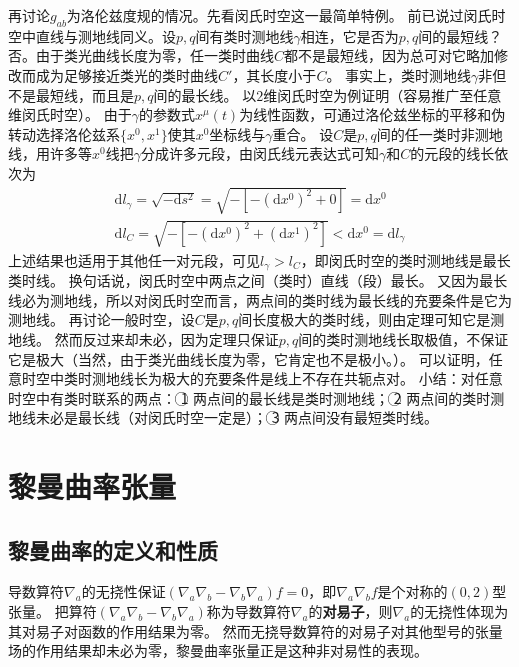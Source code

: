 再讨论$g_{ab}$为洛伦兹度规的情况。先看闵氏时空这一最简单特例。
前已说过闵氏时空中直线与测地线同义。设$p, q$间有类时测地线$\gamma$相连，它是否为$p, q$间的最短线？
否。由于类光曲线长度为零，任一类时曲线$C$都不是最短线，因为总可对它略加修改而成为足够接近类光的类时曲线$C'$，其长度小于$C$。
事实上，类时测地线$\gamma$非但不是最短线，而且是$p, q$间的最长线。
以$2$维闵氏时空为例证明（容易推广至任意维闵氏时空）。
由于$\gamma$的参数式$x^\mu(t)$为线性函数，可通过洛伦兹坐标的平移和伪转动选择洛伦兹系$\{x^0, x^1\}$使其$x^0$坐标线与$\gamma$重合。
设$C$是$p, q$间的任一类时非测地线，用许多等$x^0$线把$\gamma$分成许多元段，由闵氏线元表达式可知$\gamma$和$C$的元段的线长依次为
\begin{gather*}
\mathrm{d}l_\gamma = \sqrt{-\mathrm{d}s^2} = \sqrt{-[-(\mathrm{d}x^0)^2 + 0]} = \mathrm{d}x^0 \\
\mathrm{d}l_C = \sqrt{-[-(\mathrm{d}x^0)^2 + (\mathrm{d}x^1)^2]} < \mathrm{d}x^0 = \mathrm{d}l_\gamma
\end{gather*}
上述结果也适用于其他任一对元段，可见$l_\gamma > l_C$，即闵氏时空的类时测地线是最长类时线。
换句话说，闵氏时空中两点之间（类时）直线（段）最长。
又因为最长线必为测地线，所以对闵氏时空而言，两点间的类时线为最长线的充要条件是它为测地线。
再讨论一般时空，设$C$是$p, q$间长度极大的类时线，则由定理可知它是测地线。
然而反过来却未必，因为定理只保证$p, q$间的类时测地线长取极值，不保证它是极大（当然，由于类光曲线长度为零，它肯定也不是极小。）。
可以证明，任意时空中类时测地线长为极大的充要条件是线上不存在共轭点对。
小结：对任意时空中有类时联系的两点：
\textcircled{1} 两点间的最长线是类时测地线；
\textcircled{2} 两点间的类时测地线未必是最长线（对闵氏时空一定是）；
\textcircled{3} 两点间没有最短类时线。

\section{黎曼曲率张量}

\subsection{黎曼曲率的定义和性质}

导数算符$\nabla_a$的无挠性保证$(\nabla_a\nabla_b - \nabla_b\nabla_a)f = 0$，即$\nabla_a\nabla_bf$是个对称的$(0, 2)$型张量。
把算符$(\nabla_a\nabla_b - \nabla_b\nabla_a)$称为导数算符$\nabla_a$的\textbf{对易子}，则$\nabla_a$的无挠性体现为其对易子对函数的作用结果为零。
然而无挠导数算符的对易子对其他型号的张量场的作用结果却未必为零，黎曼曲率张量正是这种非对易性的表现。


